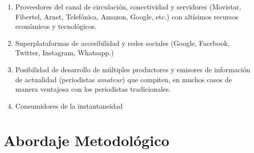 \begin{enumerate}
\def\labelenumi{\alph{enumi}.}
\item
  Proveedores del canal de circulación, conectividad y servidores (Movistar, Fibertel, Arnet, Telefónica, Amazon, Google, etc.) con altísimos recursos económicos y tecnológicos.
\item
  Superplataformas de accesibilidad y redes sociales (Google, Facebook, Twitter, Instagram, Whatsapp.)
\item
  Posibilidad de desarrollo de múltiples productores y emisores de información de actualidad (periodistas \emph{amateur}) que compiten, en muchos casos de manera ventajosa con los periodistas tradicionales.
\item
  Consumidores de la instantaneidad
\end{enumerate}

\section{Abordaje Metodológico}

